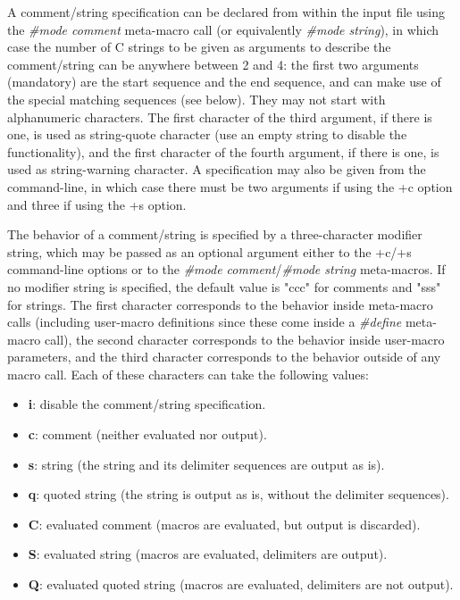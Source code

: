 A comment/string specification can be declared from within the input
file using the {\it \#mode comment} meta-macro call (or equivalently
{\it \#mode string}), in which case the number of C strings to be given as
arguments to describe the comment/string can be anywhere between 2 and 4:
the first two arguments (mandatory) are the start sequence and the end
sequence, and can make use of the special matching sequences (see below). 
They may not start with alphanumeric characters. The first
character of the third argument, if there is one, is used as string-quote 
character (use an empty string to disable the functionality), and the 
first character of the fourth argument, if there is one, is used as
string-warning character. A specification may also be given from the
command-line, in which case there must be two arguments if using the
+c option and three if using the +s option.


The behavior of a comment/string is specified by a three-character
modifier string, which may be passed as an optional argument either 
to the +c/+s command-line options or to the {\it \#mode comment}/{\it \#mode 
string} meta-macros. If no modifier string is specified, the default
value is "ccc" for comments and "sss" for strings. The first character
corresponds to the behavior inside meta-macro calls (including user-macro
definitions since these come inside a {\it \#define} meta-macro call),
the second character corresponds to the behavior inside user-macro
parameters, and the third character corresponds to the behavior outside
of any macro call. Each of these characters can take the following 
values: 
\begin{itemize}
\item
{\bf i}: 
disable the comment/string specification.
\item 
{\bf c}: 
comment (neither evaluated nor output).
\item 
{\bf s}: 
string (the string and its delimiter sequences are output as is).
\item
{\bf q}: 
quoted string (the string is output as is, without the delimiter sequences).
\item
{\bf C}: 
evaluated comment (macros are evaluated, but output is discarded).
\item
{\bf S}: 
evaluated string (macros are evaluated, delimiters are output).
\item
{\bf Q}: 
evaluated quoted string (macros are evaluated, delimiters are not output).\end{itemize}


